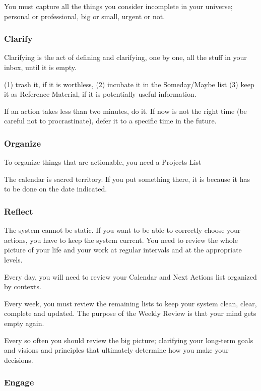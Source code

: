 You must capture all the things you consider incomplete in your universe; personal or professional, big or small, urgent or not.


\subsubsection*{Clarify}

 Clarifying is the act of
defining and clarifying, one by one, all the stuff in your inbox, until it is empty.

(1) trash it, if it is worthless, (2) incubate it in the Someday/Maybe list  (3) keep it as Reference Material, if it is potentially useful information.

If an action takes less than two minutes, do it. If now is not the right time (be careful not to procrastinate), defer it to a specific time in the future.

\subsubsection*{Organize}

To organize things that are actionable, you need a Projects List

The calendar is sacred territory. If you put something there, it is because it has to be done on the date indicated.

\subsubsection*{Reflect}

The system cannot be static. If you want to be able to correctly choose your actions, you have to keep the system current. You need to
review the whole picture of your life and your work at regular intervals and at the appropriate levels.

Every day, you will need to review your Calendar and Next Actions list organized by contexts.

Every week, you must review the remaining lists to keep your system clean, clear, complete and updated. The purpose of the Weekly
Review is that your mind gets empty again.

Every so often you should review the big picture; clarifying your long-term goals and visions and principles that ultimately determine
how you make your decisions.

\subsubsection*{Engage}

